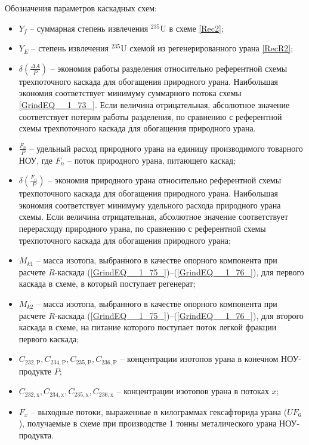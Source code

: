 Обозначения параметров каскадных схем:
\begin{itemize}
    \item $Y_f$ -- суммарная степень извлечения $^{235}$U в схеме \ref{Rec2};
    \item $Y_{E}$ -- степень извлечения $^{235}$U схемой из регенерированного урана \ref{RecR2};
    \item $\delta(\frac{\Delta A}{P})$ -- экономия работы разделения относительно референтной схемы трехпоточного каскада для обогащения природного урана. Наибольшая экономия соответствует минимуму суммарного потока схемы \ref{GrindEQ__1_73_}. Если величина отрицательная, абсолютное значение соответствует потерям работы разделения, по сравнению с референтной схемы трехпоточного каскада для обогащения природного урана.
    \item  $\frac{F_n}{P}$ -- удельный расход природного урана на единицу производимого товарного НОУ, где $F_n$ -- поток природного урана, питающего каскад;
    \item  $\delta(\frac{F_n}{P})$ -- экономия природного урана относительно референтной схемы трехпоточного каскада для обогащения природного урана.  Наибольшая экономия соответствует минимуму удельного расхода природного урана схемы. Если величина отрицательная, абсолютное значение соответствует перерасходу природного урана, по сравнению с референтной схемы трехпоточного каскада для обогащения природного урана;
    \item $M_{k1}$ -- масса изотопа, выбранного в качестве опорного компонента при расчете $R$-каскада (\ref{GrindEQ__1_75_})--(\ref{GrindEQ__1_76_}), для первого каскада в схеме, в который поступает регенерат;
    \item $M_{k2}$ -- масса изотопа, выбранного в качестве опорного компонента при расчете $R$-каскада (\ref{GrindEQ__1_75_})--(\ref{GrindEQ__1_76_}), для второго каскада в схеме, на питание которого поступает поток легкой фракции первого каскада;
    \item $C_{232,\text{P}},C_{234,\text{P}},C_{235,\text{P}},C_{236,\text{P}}$ -- концентрации изотопов урана в конечном НОУ-продукте $P$;
    \item $C_{232,\text{x}},C_{234,\text{x}},C_{235,\text{x}},C_{236,\text{x}}$ -- концентрации изотопов урана в потоках $x$;
    \item $F_{x}$ -- выходные потоки, выраженные в килограммах гексафторида урана ($UF_6$), получаемые в схеме при производстве 1 тонны металического урана НОУ-продукта.
  \end{itemize}
  
\addtocounter{table}{-1}%
